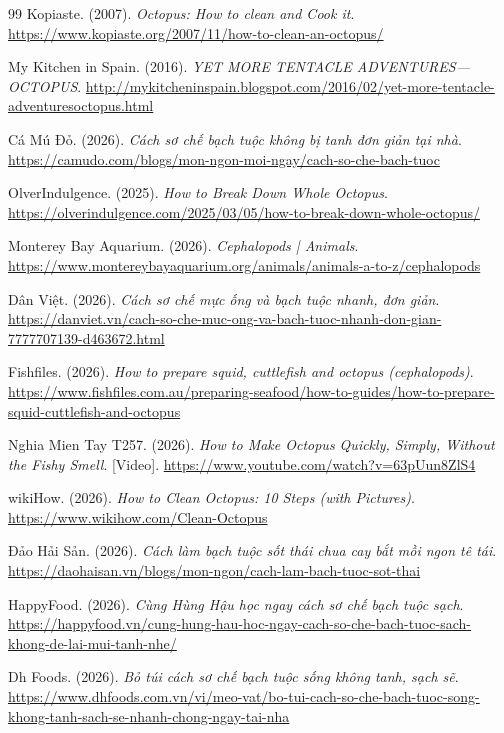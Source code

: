 \documentclass[12pt,a4paper]{report}
\begin{document}
\begin{thebibliography}{99}
 Kopiaste. (2007). \textit{Octopus: How to clean and Cook it}. \url{https://www.kopiaste.org/2007/11/how-to-clean-an-octopus/}

 My Kitchen in Spain. (2016). \textit{YET MORE TENTACLE ADVENTURES—OCTOPUS}. \url{http://mykitcheninspain.blogspot.com/2016/02/yet-more-tentacle-adventuresoctopus.html}

 Cá Mú Đỏ. (2026). \textit{Cách sơ chế bạch tuộc không bị tanh đơn giản tại nhà}. \url{https://camudo.com/blogs/mon-ngon-moi-ngay/cach-so-che-bach-tuoc}

 OlverIndulgence. (2025). \textit{How to Break Down Whole Octopus}. \url{https://olverindulgence.com/2025/03/05/how-to-break-down-whole-octopus/}

 Monterey Bay Aquarium. (2026). \textit{Cephalopods | Animals}. \url{https://www.montereybayaquarium.org/animals/animals-a-to-z/cephalopods}

 Dân Việt. (2026). \textit{Cách sơ chế mực ống và bạch tuộc nhanh, đơn giản}. \url{https://danviet.vn/cach-so-che-muc-ong-va-bach-tuoc-nhanh-don-gian-7777707139-d463672.html}

 Fishfiles. (2026). \textit{How to prepare squid, cuttlefish and octopus (cephalopods)}. \url{https://www.fishfiles.com.au/preparing-seafood/how-to-guides/how-to-prepare-squid-cuttlefish-and-octopus}

 Nghia Mien Tay T257. (2026). \textit{How to Make Octopus Quickly, Simply, Without the Fishy Smell}. [Video]. \url{https://www.youtube.com/watch?v=63pUun8ZlS4}

 wikiHow. (2026). \textit{How to Clean Octopus: 10 Steps (with Pictures)}. \url{https://www.wikihow.com/Clean-Octopus}

 Đảo Hải Sản. (2026). \textit{Cách làm bạch tuộc sốt thái chua cay bắt mồi ngon tê tái}. \url{https://daohaisan.vn/blogs/mon-ngon/cach-lam-bach-tuoc-sot-thai}

 HappyFood. (2026). \textit{Cùng Hùng Hậu học ngay cách sơ chế bạch tuộc sạch}. \url{https://happyfood.vn/cung-hung-hau-hoc-ngay-cach-so-che-bach-tuoc-sach-khong-de-lai-mui-tanh-nhe/}

 Dh Foods. (2026). \textit{Bỏ túi cách sơ chế bạch tuộc sống không tanh, sạch sẽ}. \url{https://www.dhfoods.com.vn/vi/meo-vat/bo-tui-cach-so-che-bach-tuoc-song-khong-tanh-sach-se-nhanh-chong-ngay-tai-nha}


\end{thebibliography}
\end{document}
